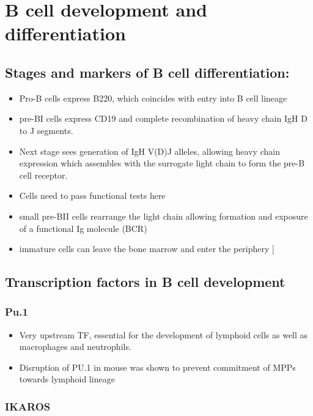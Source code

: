 \documentclass[12pt]{article}
\begin{document}
	\section{B cell development and differentiation}
	
		\subsection{Stages and markers of B cell differentiation:}
		
			\begin{itemize}
				\item Pro-B cells express B220, which coincides with entry into B cell lineage
				\item pre-BI cells express CD19 and complete recombination of heavy chain IgH D to J segments. 
				\item Next stage sees generation of IgH V(D)J alleles, allowing heavy chain expression which assembles with the surrogate light chain to form the pre-B cell receptor.
				\item Cells need to pass functional tests here
				\item small pre-BII cells rearrange the light chain allowing formation and exposure of a functional Ig molecule (BCR)
				\item immature cells can leave the bone marrow and enter the periphery \citep{Choukrallah14}]
			\end{itemize}
		
		\subsection{Transcription factors in B cell development}
		
			\subsubsection{Pu.1}

				\begin{itemize}
					\item Very upstream TF, essential for the development of lymphoid cells as well as macrophages and neutrophils. 
					\item Disruption of PU.1 in mouse was shown to prevent commitment of MPPs towards lymphoid lineage
				\end{itemize}
				
			\subsubsection{IKAROS}
				
\end{document}
